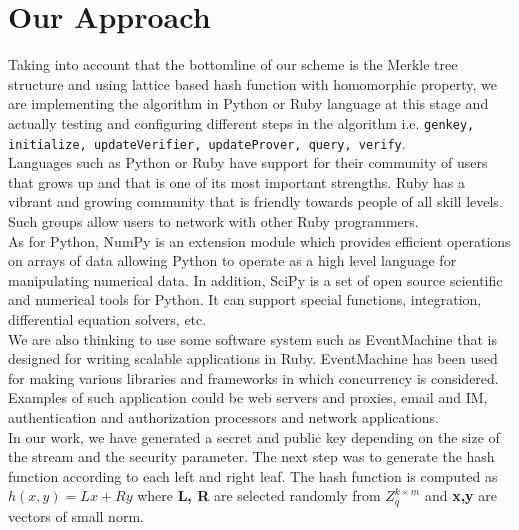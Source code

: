 \documentclass[11pt, letterpaper, oneside]{article}
\begin{document}
\section{Our Approach}

Taking into account that the bottomline of our scheme is the Merkle tree structure and using lattice based hash
function with homomorphic property, we are implementing the algorithm in Python or Ruby language at this stage and 
actually testing and configuring different steps in the algorithm i.e. \texttt{genkey, initialize, updateVerifier, updateProver, query, verify}.   \\

Languages such as Python or Ruby have support for their community of users that grows up and that
is one of its most important strengths. Ruby has a vibrant and growing community that is friendly towards
people of all skill levels. Such groups allow users to network with other Ruby
programmers.  \\

As for Python, NumPy is an extension module which provides efficient operations on arrays of data allowing
Python to operate as a high level language for manipulating numerical data.
In addition, SciPy is a set of open source scientific and numerical tools for Python. It can 
support special functions, integration, differential equation solvers, etc. \\

We are also thinking to use some software system such as EventMachine that is designed for writing
scalable applications in Ruby. EventMachine has been used for making various libraries and frameworks
in which concurrency is considered. Examples of such application could be
web servers and proxies, email and IM, authentication and authorization processors and 
network applications. \\


In our work, we have generated a secret and public key depending on the size of the stream and the 
security parameter. The next step was to generate the hash function according to each left and right leaf. 
The hash function is computed as $ h(x,y) = Lx + Ry $ where \textbf{L, R} are selected randomly from $Z_{q}^{k \times m}$ and
\textbf{x,y} are vectors of small norm. \\
\end{document}
